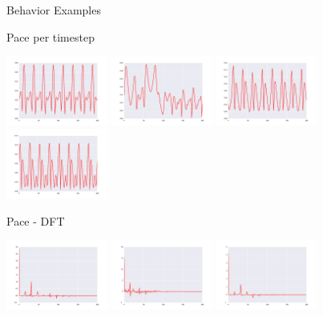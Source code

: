 \documentclass{beamer}
\begin{document}
\begin{frame}[allowframebreaks]{Behavior Examples}
\begin{minipage}{\textwidth}
\begin{block}{Pace per timestep}
\begin{center}
\includegraphics[width=0.25\textwidth]{figures/behaviors/20.pdf}
\includegraphics[width=0.25\textwidth]{figures/behaviors/21.pdf}
\includegraphics[width=0.25\textwidth]{figures/behaviors/22.pdf}
\includegraphics[width=0.25\textwidth]{figures/behaviors/23.pdf}
\end{center}
\end{block}
\begin{block}{Pace - DFT}
\begin{center}
\includegraphics[width=0.25\textwidth]{figures/behaviors/30.pdf}
\includegraphics[width=0.25\textwidth]{figures/behaviors/31.pdf}
\includegraphics[width=0.25\textwidth]{figures/behaviors/32.pdf}

\end{center}
\end{block}
\end{minipage}
\end{frame}
\end{document}
